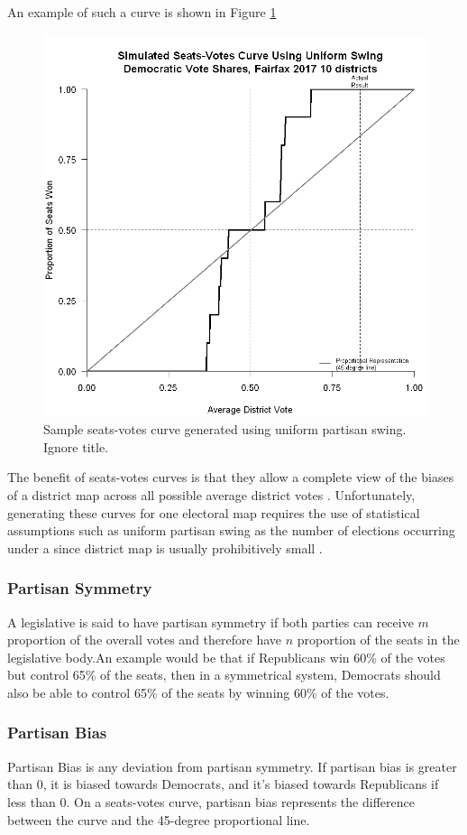 An example of such a curve is shown in Figure \ref{fig:seatsvotesups1}

\begin{figure}
    \includegraphics[width=0.5\linewidth]{img/seatsvotesups.png}
    \caption{Sample seats-votes curve generated using uniform partisan swing. Ignore title. \parencite[175]{katz2020}}
    \label{fig:seatsvotesups1}
\end{figure}

The benefit of seats-votes curves is that they allow a complete view of the biases of a district map across all possible average district votes \parencite{gelman1994}. Unfortunately, generating these curves for one electoral map requires the use of statistical assumptions such as uniform partisan swing as the number of elections occurring under a since district map is usually prohibitively small \parencite{warrington2018}.

\subsubsection{Partisan Symmetry}

A legislative is said to have partisan symmetry if both parties can receive $m$ proportion of the overall votes and therefore have $n$ proportion of the seats in the legislative body.An example would be that if Republicans win 60\% of the votes but control 65\% of the seats, then in a symmetrical system, Democrats should also be able to control 65\% of the seats by winning 60\% of the votes. \textcite{katz2020}

\subsubsection{Partisan Bias}

Partisan Bias is any deviation from partisan symmetry. If partisan bias is greater than 0, it is biased towards Democrats, and it's biased towards Republicans if less than 0. On a seats-votes curve, partisan bias represents the difference between the curve and the 45-degree proportional line. \parencite{katz2020}

